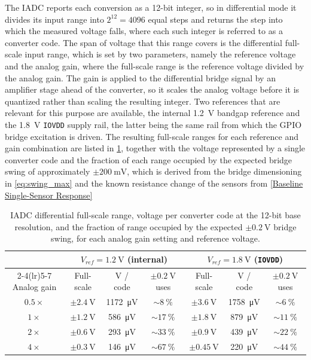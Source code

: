 The IADC reports each conversion as a 12-bit integer, so in differential mode it divides its input range into $2^{12}=4096$ equal steps and returns the step into which the measured voltage falls, where each such integer is referred to as a converter code. 
The span of voltage that this range covers is the differential full-scale input range, which is set by two parameters, namely the reference voltage and the analog gain, where the full-scale range is the reference voltage divided by the analog gain.
The gain is applied to the differential bridge signal by an amplifier stage ahead of the converter, so it scales the analog voltage before it is quantized rather than scaling the resulting integer.
Two references that are relevant for this purpose are available, the internal \SI{1.2}{\volt} bandgap reference and the \SI{1.8}{\volt} \texttt{IOVDD} supply rail, the latter being the same rail from which the GPIO bridge excitation is driven.
The resulting full-scale ranges for each reference and gain combination are listed in \cref{tab:iadc_gain}, together with the voltage represented by a single converter code and the fraction of each range occupied by the expected bridge swing of approximately $\pm\SI{200}{\milli\volt}$, which is derived from the bridge dimensioning in \cref{eq:swing_max} and the known resistance change of the sensors from \cref{Baseline Single-Sensor Response}

\begin{table}
\centering
\small
\setlength{\tabcolsep}{4pt}
\caption{IADC differential full-scale range, voltage per converter code at the 12-bit base resolution, and the fraction of range occupied by the expected $\pm\SI{0.2}{\volt}$ bridge swing, for each analog gain setting and reference voltage.}
\label{tab:iadc_gain}
\begin{tabular}{ccccccc}
\hline
 & \multicolumn{3}{c}{$V_{\mathit{ref}}=\SI{1.2}{\volt}$ (internal)} & \multicolumn{3}{c}{$V_{\mathit{ref}}=\SI{1.8}{\volt}$ (\texttt{IOVDD})} \\
\cmidrule(lr){2-4}\cmidrule(lr){5-7}
Analog gain & Full-scale & V / code & $\pm\SI{0.2}{\volt}$ uses & Full-scale & V / code & $\pm\SI{0.2}{\volt}$ uses \\
\hline
$\num{0.5}\times$ & $\pm\SI{2.4}{\volt}$  & \SI{1172}{\micro\volt} & $\sim\SI{8}{\percent}$  & $\pm\SI{3.6}{\volt}$  & \SI{1758}{\micro\volt} & $\sim\SI{6}{\percent}$ \\
$\num{1}\times$   & $\pm\SI{1.2}{\volt}$  & \SI{586}{\micro\volt}  & $\sim\SI{17}{\percent}$ & $\pm\SI{1.8}{\volt}$  & \SI{879}{\micro\volt}  & $\sim\SI{11}{\percent}$ \\
$\num{2}\times$   & $\pm\SI{0.6}{\volt}$  & \SI{293}{\micro\volt}  & $\sim\SI{33}{\percent}$ & $\pm\SI{0.9}{\volt}$  & \SI{439}{\micro\volt}  & $\sim\SI{22}{\percent}$ \\
$\num{4}\times$   & $\pm\SI{0.3}{\volt}$  & \SI{146}{\micro\volt}  & $\sim\SI{67}{\percent}$ & $\pm\SI{0.45}{\volt}$ & \SI{220}{\micro\volt}  & $\sim\SI{44}{\percent}$ \\
\hline
\end{tabular}
\end{table}

